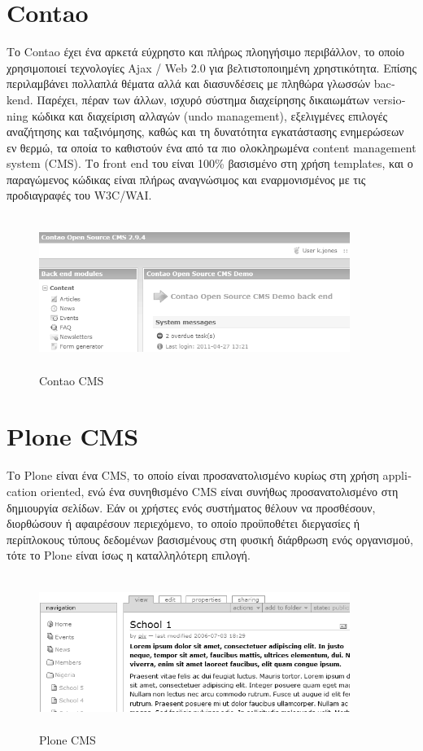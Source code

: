 \documentclass[12pt]{report}
\begin{document}
\section{\textlatin{Contao}}
Το \textlatin{Contao} έχει ένα αρκετά εύχρηστο και πλήρως πλοηγήσιμο περιβάλλον, το οποίο χρησιμοποιεί τεχνολογίες \textlatin{Ajax / Web 2.0} για βελτιστοποιημένη χρηστικότητα. Επίσης περιλαμβάνει πολλαπλά θέματα αλλά και διασυνδέσεις με πληθώρα γλωσσών \textlatin{backend}. Παρέχει, πέραν των άλλων, ισχυρό σύστημα διαχείρησης δικαιωμάτων \textlatin{versioning} κώδικα και διαχείριση αλλαγών (\textlatin{undo management}), εξελιγμένες επιλογές αναζήτησης και ταξινόμησης, καθώς και τη δυνατότητα εγκατάστασης ενημερώσεων εν θερμώ, τα οποία το καθιστούν ένα από τα πιο ολοκληρωμένα \textlatin{content management system (CMS)}. Το \textlatin{front end} του είναι 100\% βασισμένο στη χρήση \textlatin{templates}, και ο παραγώμενος κώδικας είναι πλήρως αναγνώσιμος και εναρμονισμένος με τις προδιαγραφές του \textlatin{W3C/WAI}.
\begin{figure}[H]
\centering
\includegraphics[width=0.9\textwidth, height=5cm]{Contao-gray}
\caption{\textlatin{Contao CMS}}
\label{fig:contao}
\end{figure}

\section{\textlatin{Plone CMS}}
Το \textlatin{Plone} είναι ένα \textlatin{CMS}, το οποίο είναι προσανατολισμένο κυρίως στη χρήση \textlatin{application oriented}, ενώ ένα συνηθισμένο \textlatin{CMS} είναι συνήθως προσανατολισμένο στη δημιουργία σελίδων. Εάν οι χρήστες ενός συστήματος θέλουν να προσθέσουν, διορθώσουν ή αφαιρέσουν περιεχόμενο, το οποίο προϋποθέτει διεργασίες ή περίπλοκους τύπους δεδομένων βασισμένους στη φυσική διάρθρωση ενός οργανισμού, τότε το \textlatin{Plone} είναι ίσως η καταλληλότερη επιλογή.
\begin{figure}[H]
\centering
\includegraphics[width=0.9\textwidth, height=5cm]{plone_cms-gray}
\caption{\textlatin{Plone CMS}}
\label{fig:plone}
\end{figure}
\end{document}
